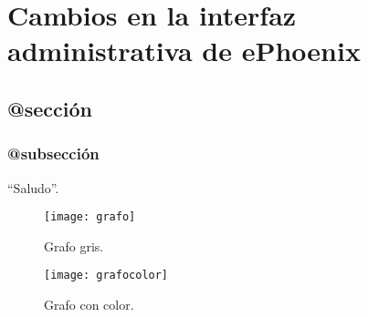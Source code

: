 \chapter{Cambios en la interfaz administrativa de ePhoenix}
\label{apendiceA}


\section{@sección}
\blindtext

\subsection{@subsección}
\Blindtext

``Saludo''.

\begin{figure}[h!]
\centering
\texttt{[image: grafo]}
\caption[Grafo]{Grafo gris.}
\label{imagen:grafo}
\end{figure}

\begin{figure}[h!]
\centering
\texttt{[image: grafocolor]}
\caption[Grafo coloreado (esto sale en la tabla de contenidos)]{Grafo con color.}
\label{imagen:grafodecolores}
\end{figure}
